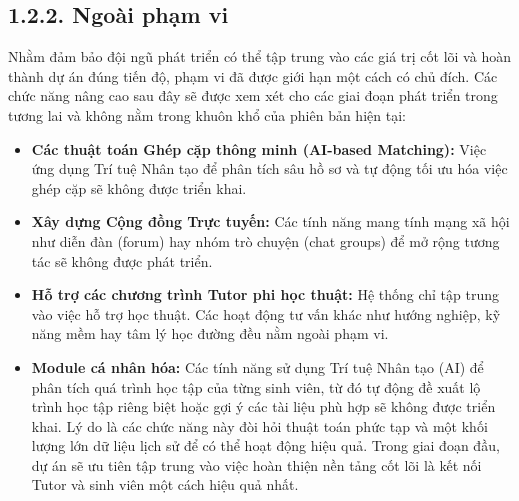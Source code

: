 
\subsection*{1.2.2. Ngoài phạm vi}
Nhằm đảm bảo đội ngũ phát triển có thể tập trung vào các giá trị cốt lõi và hoàn thành dự án đúng tiến độ, phạm vi đã được giới hạn một cách có chủ đích. Các chức năng nâng cao sau đây sẽ được xem xét cho các giai đoạn phát triển trong tương lai và không nằm trong khuôn khổ của phiên bản hiện tại:
\begin{itemize}
    \item \textbf{Các thuật toán Ghép cặp thông minh (AI-based Matching):} Việc ứng dụng Trí tuệ Nhân tạo để phân tích sâu hồ sơ và tự động tối ưu hóa việc ghép cặp sẽ không được triển khai.
    \item \textbf{Xây dựng Cộng đồng Trực tuyến:} Các tính năng mang tính mạng xã hội như diễn đàn (forum) hay nhóm trò chuyện (chat groups) để mở rộng tương tác sẽ không được phát triển.
    \item \textbf{Hỗ trợ các chương trình Tutor phi học thuật:} Hệ thống chỉ tập trung vào việc hỗ trợ học thuật. Các hoạt động tư vấn khác như hướng nghiệp, kỹ năng mềm hay tâm lý học đường đều nằm ngoài phạm vi.
    \item \textbf{Module cá nhân hóa:}  Các tính năng sử dụng Trí tuệ Nhân tạo (AI) để phân tích quá trình học tập của từng sinh viên, từ đó tự động đề xuất lộ trình học tập riêng biệt hoặc gợi ý các tài liệu phù hợp sẽ không được triển khai. Lý do là các chức năng này đòi hỏi thuật toán phức tạp và một khối lượng lớn dữ liệu lịch sử để có thể hoạt động hiệu quả. Trong giai đoạn đầu, dự án sẽ ưu tiên tập trung vào việc hoàn thiện nền tảng cốt lõi là kết nối Tutor và sinh viên một cách hiệu quả nhất.
\end{itemize}


